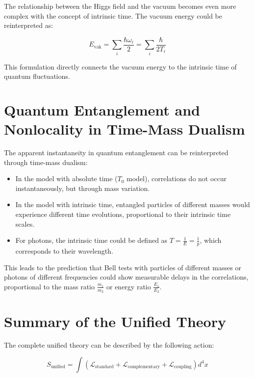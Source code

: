 \documentclass{article}
\begin{document}
	The relationship between the Higgs field and the vacuum becomes even more complex with the concept of intrinsic time.  The vacuum energy could be reinterpreted as:
	
	\begin{equation}
		E_\text{vak} = \sum_i \frac{\hbar \omega_i}{2} = \sum_i \frac{\hbar}{2T_i}
	\end{equation}
	
	This formulation directly connects the vacuum energy to the intrinsic time of quantum fluctuations.
	
	\section{Quantum Entanglement and Nonlocality in Time-Mass Dualism}
	
	The apparent instantaneity in quantum entanglement can be reinterpreted through time-mass dualism:
	
	\begin{itemize}
		\item In the model with absolute time ($T_0$ model), correlations do not occur instantaneously, but through mass variation.
		\item In the model with intrinsic time, entangled particles of different masses would experience different time evolutions, proportional to their intrinsic time scales.
		\item For photons, the intrinsic time could be defined as $T = \frac{1}{E} = \frac{1}{p}$, which corresponds to their wavelength.
	\end{itemize}
	
	This leads to the prediction that Bell tests with particles of different masses or photons of different frequencies could show measurable delays in the correlations, proportional to the mass ratio $\frac{m_1}{m_2}$ or energy ratio $\frac{E_1}{E_2}$.
	
	\section{Summary of the Unified Theory}
	
	The complete unified theory can be described by the following action:
	
	\begin{equation}
		S_\text{unified} = \int \left( \mathcal{L}_\text{standard} + \mathcal{L}_\text{complementary} + \mathcal{L}_\text{coupling} \right) d^4x
	\end{equation}
	
\end{document}
